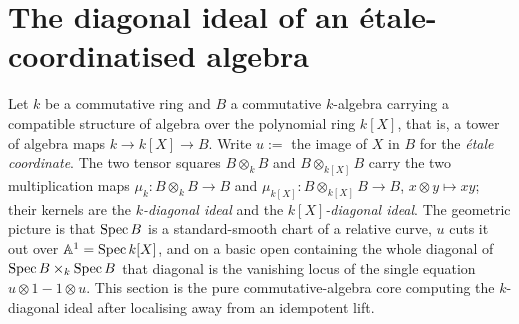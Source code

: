 \section{The diagonal ideal of an \'etale-coordinatised algebra}
\label{pa-sec:diagonal_ideal}

Let \(k\) be a commutative ring and \(B\) a commutative \(k\)-algebra carrying a compatible
structure of algebra over the polynomial ring \(k[X]\), that is, a tower of algebra maps
\(k \to k[X] \to B\). Write \(u := \) the image of \(X\) in \(B\) for the \emph{\'etale
coordinate}. The two tensor squares \(B \otimes_k B\) and \(B \otimes_{k[X]} B\) carry the two
multiplication maps \(\mu_k \colon B \otimes_k B \to B\) and \(\mu_{k[X]} \colon B
\otimes_{k[X]} B \to B\), \(x \otimes y \mapsto xy\); their kernels are the \emph{\(k\)-diagonal
ideal} and the \emph{\(k[X]\)-diagonal ideal}. The geometric picture is that \(\operatorname{Spec} B\) is a
standard-smooth chart of a relative curve, \(u\) cuts it out over \(\mathbb A^1 = \operatorname{Spec} k[X]\),
and on a basic open containing the whole diagonal of \(\operatorname{Spec} B \times_k \operatorname{Spec} B\) that diagonal
is the vanishing locus of the single equation \(u \otimes 1 - 1 \otimes u\). This section is the
pure commutative-algebra core computing the \(k\)-diagonal ideal after localising away from an
idempotent lift.

